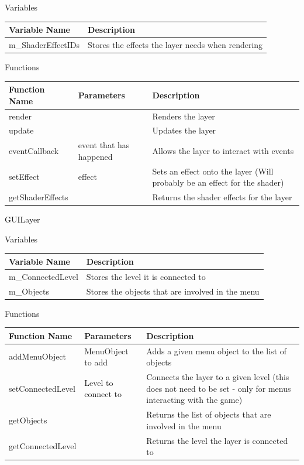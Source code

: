 \documentclass[../../Main.tex]{subfiles}
\begin{document}
    \begin{center}
        Variables
        \begin{tabular}{ | m{} | m{} | }
            \hline
            \textbf{Variable Name} & \textbf{Description} \\
            \hline
            m\_ShaderEffectIDs & Stores the effects the layer needs when rendering \\
            \hline
        \end{tabular}
        Functions
        \begin{tabular}{ | m{} | m{}| m{} | }
            \hline
            \textbf{Function Name} & \textbf{Parameters} & \textbf{Description} \\
            \hline
            render & & Renders the layer \\
            \hline
            update & & Updates the layer \\
            \hline
            eventCallback & event that has happened & Allows the layer to interact with events \\
            \hline
            setEffect & effect & Sets an effect onto the layer (Will probably be an effect for the shader) \\
            \hline
            getShaderEffects & & Returns the shader effects for the layer \\
            \hline
        \end{tabular}
    \end{center}
    GUILayer
    \begin{center}
        Variables
        \begin{tabular}{ | m{} | m{} | }
            \hline
            \textbf{Variable Name} & \textbf{Description} \\
            \hline
            m\_ConnectedLevel & Stores the level it is connected to \\
            \hline
            m\_Objects & Stores the objects that are involved in the menu \\
            \hline
        \end{tabular}
        Functions
        \begin{tabular}{ | m{} | m{}| m{} | }
            \hline
            \textbf{Function Name} & \textbf{Parameters} & \textbf{Description} \\
            \hline
            addMenuObject & MenuObject to add & Adds a given menu object to the list of objects \\
            \hline
            setConnectedLevel & Level to connect to & Connects the layer to a given level (this does not need  to be set - only for menus interacting with the game) \\
            \hline
            getObjects & & Returns the list of objects that are involved in the menu \\
            \hline
            getConnectedLevel & & Returns the level the layer is connected to \\
            \hline
        \end{tabular}
    \end{center}
\end{document}
